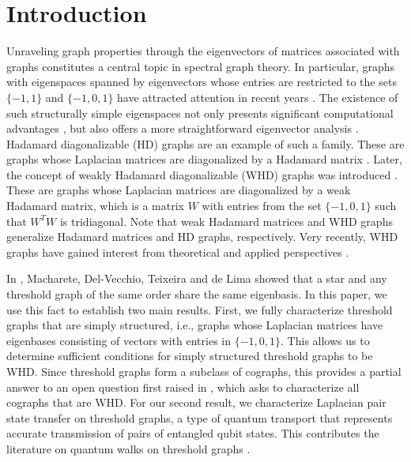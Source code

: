\documentclass[preprint]{elsarticle}
\begin{document}

\section{Introduction}\label{intro}

Unraveling graph properties through the eigenvectors of matrices associated with graphs constitutes a central topic in spectral graph theory. In particular, graphs with eigenspaces spanned by eigenvectors whose entries are restricted to the sets $\{-1,1\}$ and $\{- 1,0,1 \}$ have attracted attention in recent years \cite{WHD, AL21, ALN23, Caputo, JP25,  MDTL24, WeakMatrices}. The existence of such structurally simple eigenspaces not only presents significant computational advantages \cite{SS07}, but also offers a more straightforward eigenvector analysis \cite{SS08}. Hadamard diagonalizable (HD) graphs are an example of such a family. These are graphs whose Laplacian matrices are diagonalized by a Hadamard matrix \cite{barik2011}. Later, the concept of weakly Hadamard diagonalizable (WHD) graphs was introduced \cite{WHD}. These are graphs whose Laplacian matrices are diagonalized by a weak Hadamard matrix, which is a matrix $W$ with entries from the set $\{-1,0,1\}$ such that $W^{T}W$ is tridiagonal. Note that weak Hadamard matrices and WHD graphs generalize Hadamard matrices and HD graphs, respectively. Very recently, WHD graphs have gained interest from theoretical \cite{JP25,MDTL24} and applied perspectives \cite{WeakMatrices}. 

In \cite{MDTL24}, Macharete, Del-Vecchio, Teixeira and de Lima showed that a star and any threshold graph of the same order share the same eigenbasis. In this paper, we use this fact to establish two main results. First, we fully characterize threshold graphs that are simply structured, i.e., graphs whose Laplacian matrices have eigenbases consisting of vectors with entries in $\{-1,0,1\}$. This allows us to determine sufficient conditions for simply structured threshold graphs to be WHD. Since threshold graphs form a subclass of cographs, this provides a partial answer to an open question first raised in \cite{WHD}, which asks to characterize all cographs that are WHD. For our second result, we characterize Laplacian pair state transfer on threshold graphs, a type of quantum transport that represents accurate transmission of pairs of entangled qubit states. This contributes the literature on quantum walks on threshold graphs \cite{kirkland2011spin,kirkland2020fractional,monterde2026new}.
\end{document}
